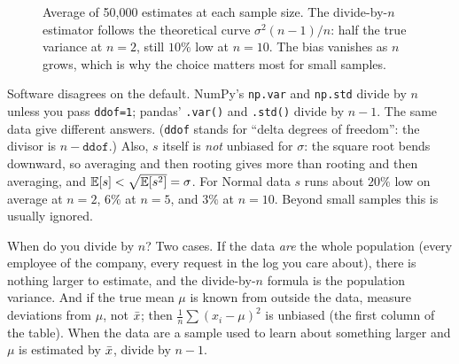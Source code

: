 \begin{figure}[H]
\centering
{}
\caption{Average of 50{,}000 estimates at each sample size. The divide-by-$n$
estimator follows the theoretical curve $\sigma^2(n-1)/n$: half the true variance at
$n=2$, still $10\%$ low at $n=10$. The bias vanishes as $n$ grows, which is why the
choice matters most for small samples.}
\label{fig:center-spread-bessel-n}
\end{figure}

\begin{trapbox}
Software disagrees on the default. NumPy's \texttt{np.var} and \texttt{np.std}
divide by $n$ unless you pass \texttt{ddof=1}; pandas' \texttt{.var()} and
\texttt{.std()} divide by $n-1$. The same data give different answers. (\texttt{ddof}
stands for ``delta degrees of freedom'': the divisor is $n-\texttt{ddof}$.) Also, $s$
itself is \emph{not} unbiased for $\sigma$: the square root bends downward, so
averaging and then rooting gives more than rooting and then averaging, and
$\operatorname{\mathbb{E}}[s] < \sqrt{\operatorname{\mathbb{E}}[s^2]} = \sigma$. For Normal data $s$ runs about $20\%$ low on
average at $n=2$, $6\%$ at $n=5$, and $3\%$ at $n=10$. Beyond small samples this is
usually ignored.
\end{trapbox}

When do you divide by $n$? Two cases. If the data \emph{are} the whole population
(every employee of the company, every request in the log you care about), there is
nothing larger to estimate, and the divide-by-$n$ formula is the population
variance. And if the true mean $\mu$ is known from outside the data, measure
deviations from $\mu$, not $\bar{x}$; then $\frac1n\sum(x_i-\mu)^2$ is unbiased (the
first column of the table). When the data are a sample used to learn about
something larger and $\mu$ is estimated by $\bar{x}$, divide by $n-1$.

